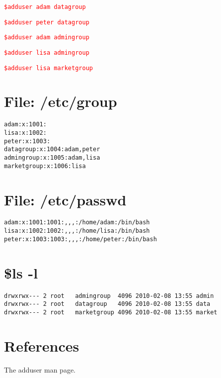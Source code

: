 \documentclass[a4paper,10pt]{article}
\begin{document}
\textcolor{red}{\texttt{\$adduser adam datagroup}}

\textcolor{red}{\texttt{\$adduser peter datagroup}}

\textcolor{red}{\texttt{\$adduser adam admingroup}}

\textcolor{red}{\texttt{\$adduser lisa admingroup}}

\textcolor{red}{\texttt{\$adduser lisa marketgroup}}

\appendix
\section{File: /etc/group}
\begin{verbatim}
adam:x:1001:
lisa:x:1002:
peter:x:1003:
datagroup:x:1004:adam,peter
admingroup:x:1005:adam,lisa
marketgroup:x:1006:lisa
\end{verbatim}

\section{File: /etc/passwd}
\begin{verbatim}
adam:x:1001:1001:,,,:/home/adam:/bin/bash
lisa:x:1002:1002:,,,:/home/lisa:/bin/bash
peter:x:1003:1003:,,,:/home/peter:/bin/bash
\end{verbatim}

\section{\$ls -l}
\begin{verbatim}
drwxrwx--- 2 root   admingroup  4096 2010-02-08 13:55 admin
drwxrwx--- 2 root   datagroup   4096 2010-02-08 13:55 data
drwxrwx--- 2 root   marketgroup 4096 2010-02-08 13:55 market
\end{verbatim}

\section{References}
The adduser man page.
\end{document}
